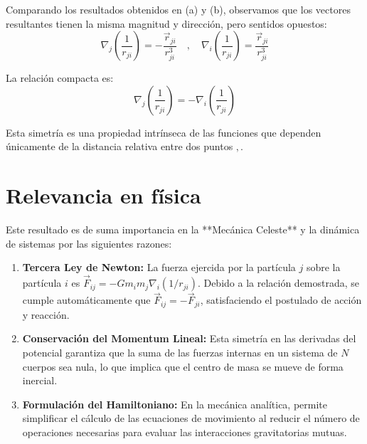 \documentclass[a4paper]{article}
\begin{document}
Comparando los resultados obtenidos en (a) y (b), observamos que los vectores resultantes tienen la misma magnitud y dirección, pero sentidos opuestos:
$$ \nabla_j \left( \frac{1}{r_{ji}} \right) = -\frac{\vec{r}_{ji}}{r_{ji}^3} \quad , \quad \nabla_i \left( \frac{1}{r_{ji}} \right) = \frac{\vec{r}_{ji}}{r_{ji}^3} $$

La relación compacta es:
$$ \nabla_j \left( \frac{1}{r_{ji}} \right) = -\nabla_i \left( \frac{1}{r_{ji}} \right) $$

Esta simetría es una propiedad intrínseca de las funciones que dependen únicamente de la distancia relativa entre dos puntos $,$.

\section*{Relevancia en física}

Este resultado es de suma importancia en la **Mecánica Celeste** y la dinámica de sistemas por las siguientes razones:

\begin{enumerate}
    \item \textbf{Tercera Ley de Newton:} La fuerza ejercida por la partícula $j$ sobre la partícula $i$ es $\vec{F}_{ij} = -G m_i m_j \nabla_i (1/r_{ji})$. Debido a la relación demostrada, se cumple automáticamente que $\vec{F}_{ij} = -\vec{F}_{ji}$, satisfaciendo el postulado de acción y reacción.
    \item \textbf{Conservación del Momentum Lineal:} Esta simetría en las derivadas del potencial garantiza que la suma de las fuerzas internas en un sistema de $N$ cuerpos sea nula, lo que implica que el centro de masa se mueve de forma inercial.
    \item \textbf{Formulación del Hamiltoniano:} En la mecánica analítica, permite simplificar el cálculo de las ecuaciones de movimiento al reducir el número de operaciones necesarias para evaluar las interacciones gravitatorias mutuas.
\end{enumerate}





 
\end{document}
